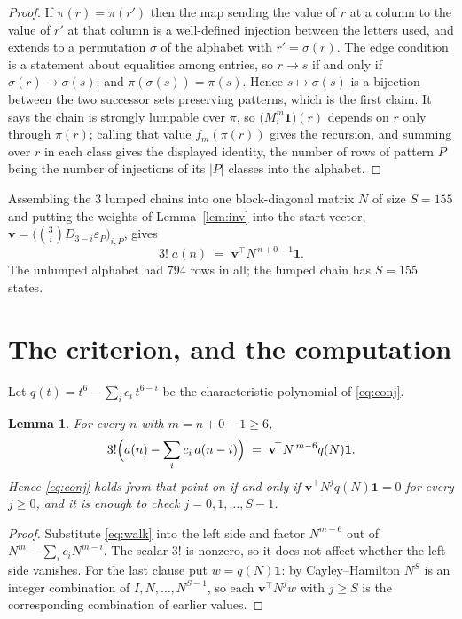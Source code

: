 \documentclass[11pt,a4paper]{article}
\theoremstyle{plain}
\newtheorem{lemma}[theorem]{Lemma}
\theoremstyle{definition}
\begin{document}
\begin{proof}
If $\pi(r)=\pi(r')$ then the map sending the value of $r$ at a column to the value of $r'$
at that column is a well-defined injection between the letters used, and extends to a
permutation $\sigma$ of the alphabet with $r'=\sigma(r)$. The edge condition is a statement
about equalities among entries, so $r\to s$ if and only if $\sigma(r)\to\sigma(s)$; and
$\pi(\sigma(s))=\pi(s)$. Hence $s\mapsto\sigma(s)$ is a bijection between the two successor
sets preserving patterns, which is the first claim. It says the chain is strongly lumpable
over $\pi$, so $\bigl(M_i^{m}\mathbf{1}\bigr)(r)$ depends on $r$ only through $\pi(r)$;
calling that value $f_m(\pi(r))$ gives the recursion, and summing over $r$ in each class
gives the displayed identity, the number of rows of pattern $P$ being the number of
injections of its $|P|$ classes into the alphabet.
\end{proof}

Assembling the $3$ lumped chains into one block-diagonal matrix $N$ of size $S=155$ and
putting the weights of Lemma~\ref{lem:inv} into the start vector,
$\mathbf{v}=\bigl(\binom{3}{i}D_{3-i}\varepsilon_P\bigr)_{i,P}$, gives
\begin{equation}\label{eq:walk}
3!\;a(n)\;=\;\mathbf{v}^{\!\top}N^{\,n+0-1}\mathbf{1} .
\end{equation}
The unlumped alphabet had $794$ rows in all; the lumped chain has $S=155$ states.

\section{The criterion, and the computation}

Let $q(t)=t^{6}-\sum_i c_i\,t^{6-i}$ be the characteristic polynomial of
\eqref{eq:conj}.

\begin{lemma}\label{lem:crit}
For every $n$ with $m=n+0-1\ge6$,
\[
3!\Bigl(a(n)-\sum_i c_i\,a(n-i)\Bigr)\;=\;\mathbf{v}^{\!\top}N^{\,m-6}q(N)\mathbf{1} .
\]
Hence \eqref{eq:conj} holds from that point on if and only if
$\mathbf{v}^{\!\top}N^{j}q(N)\mathbf{1}=0$ for every $j\ge0$, and it is enough to check
$j=0,1,\dots,S-1$.
\end{lemma}

\begin{proof}
Substitute \eqref{eq:walk} into the left side and factor $N^{m-6}$ out of
$N^{m}-\sum_i c_iN^{m-i}$. The scalar $3!$ is nonzero, so it does not affect whether
the left side vanishes. For the last clause put $w=q(N)\mathbf{1}$: by Cayley--Hamilton
$N^{S}$ is an integer combination of $I,N,\dots,N^{S-1}$, so each
$\mathbf{v}^{\!\top}N^{j}w$ with $j\ge S$ is the corresponding combination of earlier
values.
\end{proof}
\end{document}
